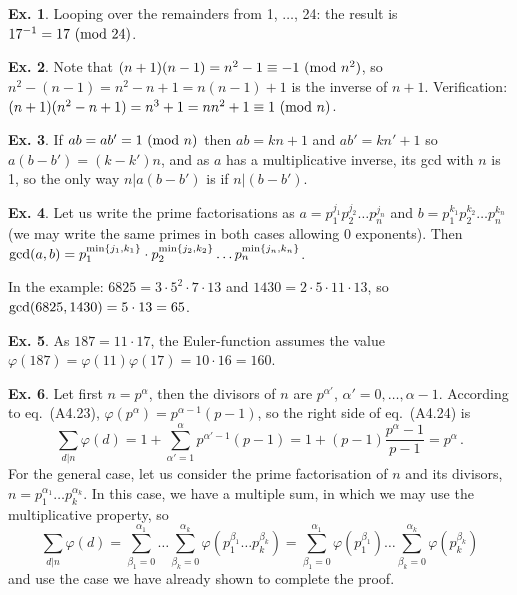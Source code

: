 \documentclass[a4paper,12pt]{article}
\theoremstyle{definition}
\newtheorem{exercise}{Ex.}[section]
\begin{document}
\begin{exercise}
 Looping over the remainders from 1, $\dots$, 24: the result is $17^{-1} = 17\ ({\rm mod\ } 24)$.
\end{exercise}

\begin{exercise}
 Note that $(n+1)(n-1)=n^2-1 \equiv -1\ ({\rm mod\ }n^2)$, so $n^2-(n-1)=n^2-n+1=n(n-1)+1$ is the inverse of $n+1$. Verification: $(n+1)(n^2-n+1) =n^3 + 1=n n^2+1\equiv 1\ ({\rm mod\ }n)$.
\end{exercise}

\begin{exercise}
 If $ab=ab'=1\ ({\rm mod\ } n)$ then $ab=kn+1$ and $ab'=kn'+1$ so $a(b-b')=(k-k')n$, and as $a$ has a multiplicative inverse, its gcd with $n$ is 1, so the only way $n| a(b-b')$ is if $n|(b-b')$.
\end{exercise}

\begin{exercise}
 Let us write the prime factorisations as $a=p_1^{j_1}p_2^{j_2}\dots p_n^{j_n}$ and $b=p_1^{k_1}p_2^{k_2}\dots p_n^{k_n}$ (we may write the same primes in both cases allowing 0 exponents). Then ${\rm gcd}(a, b)=p_1^{\min\{j_1, k_1\}}\cdot p_2^{\min\{j_2, k_2\}}\dots p_n^{\min\{j_n, k_n\}}$.
 
 In the example: $6825=3\cdot 5^2 \cdot 7 \cdot 13$ and $1430=2\cdot 5 \cdot 11\cdot 13$, so ${\rm gcd}(6825, 1430) = 5\cdot 13=65$.
\end{exercise}

\begin{exercise}
 As $187=11\cdot 17$, the Euler-function assumes the value $\varphi(187)=\varphi(11)\varphi(17)=10\cdot 16=160$.
\end{exercise}

\begin{exercise}
 Let first $n=p^\alpha$, then the divisors of $n$ are $p^{\alpha'}$, $\alpha'=0,\dots,\alpha-1$. According to eq.\ (A4.23), $\varphi(p^\alpha)=p^{\alpha-1}(p-1)$, so the right side of eq.\ (A4.24) is
 \[
  \sum_{d|n}\varphi(d) = 1+\sum_{\alpha'=1}^\alpha p^{\alpha'-1}(p-1)= 1 + (p-1)\frac{p^\alpha-1}{p-1} = p^\alpha\,.
 \]
 For the general case, let us consider the prime factorisation of $n$ and its divisors, $n=p_1^{\alpha_1}\dots p_k^{\alpha_k}$. In this case, we have a multiple sum, in which we may use the multiplicative property, so
 \[
  \sum_{d|n}\varphi(d) = \sum_{\beta_1=0}^{\alpha_1}\dots \sum_{\beta_k=0}^{\alpha_k}\varphi(p_1^{\beta_1}\dots p_k^{\beta_k})=\sum_{\beta_1=0}^{\alpha_1} \varphi(p_1^{\beta_1}) \dots \sum_{\beta_k=0}^{\alpha_k} \varphi(p_k^{\beta_k})
 \]
 and use the case we have already shown to complete the proof.
\end{exercise}
\end{document}
